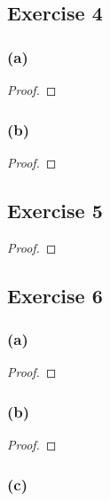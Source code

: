 \documentclass[14pt]{extarticle}
\begin{document}
\subsection{Exercise 4}

\subsubsection{(a)}

\begin{proof}

\end{proof}

\subsubsection{(b)}

\begin{proof}

\end{proof}

\subsection{Exercise 5}

\begin{proof}

\end{proof}

\subsection{Exercise 6}

\subsubsection{(a)}

\begin{proof}

\end{proof}

\subsubsection{(b)}

\begin{proof}

\end{proof}

\subsubsection{(c)}
\end{document}
